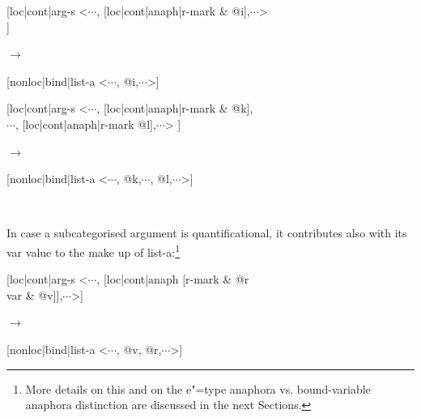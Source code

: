 \documentclass[output=paper
,modfonts
,nonflat]{langsci/langscibook}
\begin{document}
 \begin{samepage}
\begin{exe}
\ex\label{lexconst}
\end{exe}

\avmfont{\sc}
\avmvalfont{\it}
\begin{avm}
\hfill
{[loc|cont|arg-s <$\cdots$,
																																							 [loc|cont|anaph|r-mark & @i],$\cdots$>\\
	]}
\end{avm}
\begin{flushright}
$\longrightarrow$
\begin{avm}
\hfill
{[nonloc|bind|list-a <$\cdots$, @i,$\cdots$>]}
\end{avm}
\end{flushright}

\begin{avm}
\hfill
{[loc|cont|arg-s <$\cdots$, [loc|cont|anaph|r-mark & @k],\\
																																								$\cdots$,
																																						[loc|cont|anaph|r-mark @l],$\cdots$>
	]}
\end{avm}
\begin{flushright}
$\longrightarrow$
\begin{avm}
\hfill
{[nonloc|bind|list-a <$\cdots$, @k,$\cdots$, @l,$\cdots$>]}
\end{avm}
\avmoptions{}
\\

\end{flushright}
\end{samepage}

\vspace{.3cm}
In case a subcategorised argument is quantificational, 
it contributes also with its {\sc var} value to the make up of
{\sc list-a}:\footnote{
More details on this and on the
e"=type anaphora vs. bound-variable anaphora distinction are discussed
in the next Sections.}

\begin{exe}
\ex\label{lexconst2}
\end{exe}

\avmfont{\sc}
\avmvalfont{\it}
\begin{avm}
\hfill
{[loc|cont|arg-s <$\cdots$,
																																							 [loc|cont|anaph [r-mark & @r\\var &
@v]],$\cdots$>]}
\end{avm}
\begin{flushright}
$\longrightarrow$
\begin{avm}
{[nonloc|bind|list-a <$\cdots$, @v, @r,$\cdots$>]}
\end{avm}
\end{flushright}
\avmoptions{}
\end{document}
